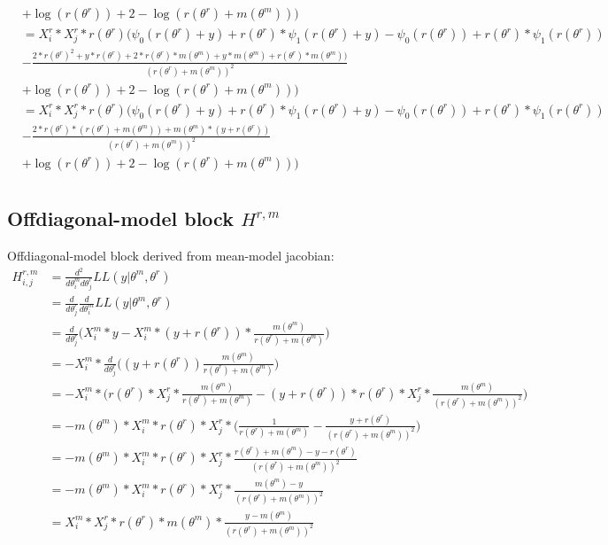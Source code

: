 \documentclass[bibliography=totoc,10pt]{scrartcl}
\begin{document}
\begin{equation}
\begin{split}
&+ \log(r(\theta^r)) + 2-  \log(r(\theta^r)+m(\theta^m)) \bigg) \\
&=X^r_{i} * X^r_{j} * r(\theta^r) \bigg( \psi_0(r(\theta^r)+y) + r(\theta^r) * \psi_1(r(\theta^r)+y) - \psi_0(r(\theta^r)) + r(\theta^r) * \psi_1(r(\theta^r)) \\
&- \frac{2*r(\theta^r)^2 + y*r(\theta^r) + 2*r(\theta^r)*m(\theta^m)+y*m(\theta^m)+r(\theta^r)*m(\theta^m))}{(r(\theta^r)+m(\theta^m))^2}\\
&+ \log(r(\theta^r)) + 2-  \log(r(\theta^r)+m(\theta^m)) \bigg) \\
&=X^r_{i} * X^r_{j} * r(\theta^r) \bigg( \psi_0(r(\theta^r)+y) + r(\theta^r) * \psi_1(r(\theta^r)+y) - \psi_0(r(\theta^r)) + r(\theta^r) * \psi_1(r(\theta^r)) \\
&- \frac{2*r(\theta^r)*(r(\theta^r)+m(\theta^m)) + m(\theta^m)*(y+r(\theta^r))}{(r(\theta^r)+m(\theta^m))^2}\\
&+ \log(r(\theta^r)) + 2-  \log(r(\theta^r)+m(\theta^m)) \bigg) \\
\end{split}
\end{equation}

\subsection{Offdiagonal-model block $H^{r,m}$}
Offdiagonal-model block derived from mean-model jacobian:
\begin{equation}
\begin{split}
H^{r,m}_{i,j} &= \frac{d^2}{d \theta^m_i d \theta^r_j} LL(y|\theta^m, \theta^r) \\
&= \frac{d}{d \theta^r_j} \frac{d}{d \theta^m_i} LL(y|\theta^m, \theta^r) \\
&= \frac{d}{d \theta^r_j} \bigg( X^m_{i}*y - X^m_{i}*(y+r(\theta^r))*\frac{m(\theta^m)}{r(\theta^r)+m(\theta^m)} \bigg) \\
&= -X^m_{i}* \frac{d}{d \theta^r_j} \bigg(  (y+r(\theta^r)) \frac{m(\theta^m)}{r(\theta^r)+m(\theta^m)} \bigg) \\
&= -X^m_{i}* \bigg(  r(\theta^r) * X^r_{j} * \frac{m(\theta^m)}{r(\theta^r)+m(\theta^m)} - (y+r(\theta^r)) *  r(\theta^r) * X^r_{j}  * \frac{m(\theta^m)}{(r(\theta^r)+m(\theta^m))^2} \bigg) \\
&= - m(\theta^m) * X^m_{i}   * r(\theta^r) * X^r_{j}  * \bigg( \frac{1}{r(\theta^r)+m(\theta^m)} - \frac{y+r(\theta^r)}{(r(\theta^r)+m(\theta^m))^2} \bigg) \\
&= - m(\theta^m) * X^m_{i}   * r(\theta^r) * X^r_{j}  *  \frac{r(\theta^r)+m(\theta^m)-y-r(\theta^r)}{(r(\theta^r)+m(\theta^m))^2} \\
&= - m(\theta^m) * X^m_{i}   * r(\theta^r) * X^r_{j}  *  \frac{m(\theta^m)-y}{(r(\theta^r)+m(\theta^m))^2} \\
&= X^m_{i} * X^r_{j} * r(\theta^r) * m(\theta^m) *  \frac{y - m(\theta^m)}{(r(\theta^r)+m(\theta^m))^2} \\
\end{split}
\end{equation}
\end{document}
